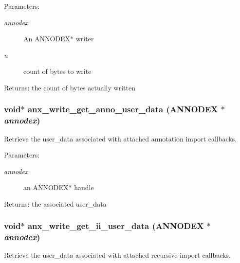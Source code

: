 \begin{Desc}
\item[Parameters:]
\begin{description}
\item[{\em annodex}]An ANNODEX$\ast$ writer \item[{\em n}]count of bytes to write \end{description}
\end{Desc}
\begin{Desc}
\item[Returns:]the count of bytes actually written \end{Desc}
\subsubsection{\setlength{\rightskip}{0pt plus 5cm}void$\ast$ anx\_\-write\_\-get\_\-anno\_\-user\_\-data ({\bf ANNODEX} $\ast$ {\em annodex})}\label{anx__write_8h_a4}


Retrieve the user\_\-data associated with attached annotation import callbacks. 

\begin{Desc}
\item[Parameters:]
\begin{description}
\item[{\em annodex}]an ANNODEX$\ast$ handle \end{description}
\end{Desc}
\begin{Desc}
\item[Returns:]the associated user\_\-data \end{Desc}
\subsubsection{\setlength{\rightskip}{0pt plus 5cm}void$\ast$ anx\_\-write\_\-get\_\-ii\_\-user\_\-data ({\bf ANNODEX} $\ast$ {\em annodex})}\label{anx__write_8h_a6}


Retrieve the user\_\-data associated with attached recursive import callbacks. 

